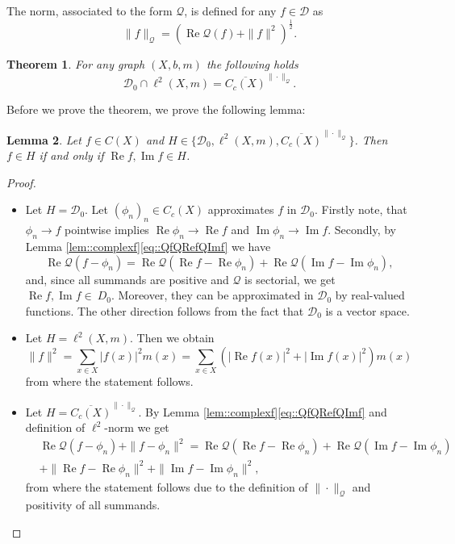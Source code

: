 \documentclass[a4paper,11pt]{amsart}
\newtheorem{theorem}{Theorem}[section]
\newtheorem{lemma}[theorem]{Lemma}
\theoremstyle{definition}
\renewcommand{\Re}{\operatorname{Re}}%
\renewcommand{\Im}{\operatorname{Im}}%
\newcommand{\D}{\mathcal{D}}
\newcommand{\Q}{\mathcal{Q}}
\begin{document}
The norm, associated to the form $\mathcal Q$, is defined for any $f\in \mathcal D$ as
$$
\|f\|_\mathcal Q=(\Re \mathcal Q(f)+\|f\|^2)^{\frac{1}{2}}.
$$



\begin{theorem}\label{thm::dol2cQ}
For any graph  $(X,b,m)$ the following holds
$$
\mathcal D_0\cap \ell^2(X,m)=\overline{C_c(X)}^{\|\cdot\|_\mathcal Q}.
$$
\end{theorem}

Before we prove the theorem, we prove the following lemma:
\begin{lemma}\label{lem::fRefImfH}
Let $f\in C(X)$ and $H \in \Big\{\mathcal D_0, \ell^2(X,m), \overline{C_c(X)}^{\|\cdot\|_\mathcal Q}\Big\}$. Then
$f\in H$ if and only if $\Re f, \Im f\in H$.
\end{lemma}
\begin{proof}
\begin{itemize}[leftmargin=*]
\item
Let $H=\mathcal D_0$. 
Let $(\phi_n)_n\in C_c(X)$ approximates $f$ in $\D_0$. Firstly note, that
$\phi_n\to f$ pointwise implies $\Re \phi_n\to \Re f$ and $\Im \phi_n\to \Im f$. 
Secondly, by Lemma \ref{lem::complexf}\eqref{eq::QfQRefQImf} we have
$$
\Re \mathcal Q(f-\phi_n)=\Re \mathcal Q(\Re f-\Re \phi_n)+\Re \mathcal Q(\Im f-\Im \phi_n),
$$
and, since all summands are positive and $\Q$ is sectorial, we get
 $\Re f, \Im f \in~D_0$. Moreover, they can be approximated in $\mathcal D_0$ by real-valued functions. The other direction follows from the fact that $\D_0$ is a vector space.
\item
Let $H=\ell^2(X,m)$. Then we obtain
$$
\|f\|^2=\sum_{x\in X}|f(x)|^2m(x)=\sum_{x\in X}(|\Re f(x)|^2+|\Im f(x)|^2)m(x)
$$
from where the statement follows.
\item
Let $H=\overline{C_c(X)}^{\|\cdot\|_\mathcal Q}$.
By Lemma \ref{lem::complexf}\eqref{eq::QfQRefQImf}  and definition of $\ell^2$-norm we get
\begin{align*}
&\Re \mathcal Q(f-\phi_n)+\|f-\phi_n\|^2=\Re \mathcal Q(\Re f-\Re \phi_n)+\Re \mathcal Q(\Im  f-\Im \phi_n)\\
&+\|\Re f-\Re \phi_n\|^2+\|\Im f-\Im \phi_n\|^2,
\end{align*}
from where the statement follows due to the definition of $\|\cdot\|_\mathcal Q$ and positivity of all summands. 
\end{itemize}
\end{proof}
\end{document}
